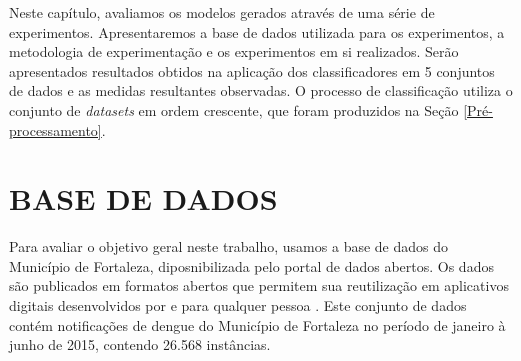 \documentclass[
	12pt,				%
	openright,			%
	oneside,	
	a4paper,				%
	english,				%
	brazil				%
]{abntex2/abntex2} %
\begin{document}
	Neste capítulo, avaliamos os modelos gerados através de uma série de experimentos. Apresentaremos a base de dados utilizada para os experimentos, a metodologia de experimentação e os experimentos em si realizados. Serão apresentados resultados obtidos na aplicação dos classificadores em  5  conjuntos de dados e as medidas resultantes observadas. O processo de classificação utiliza o conjunto de \textit{datasets} em ordem crescente, que foram  produzidos na Seção \ref{Pré-processamento}. %

	\section{BASE DE DADOS}
	
	Para avaliar o objetivo geral neste trabalho, usamos a base de dados  do Município de Fortaleza, diposnibilizada pelo portal de dados abertos. Os dados são publicados em formatos abertos que permitem sua reutilização  em aplicativos digitais desenvolvidos por e para qualquer pessoa \cite{fortaleza:2015}. Este conjunto de dados contém notificações de dengue do Município de Fortaleza no período de janeiro à junho de 2015, contendo 26.568 instâncias. %
	

\end{document}
